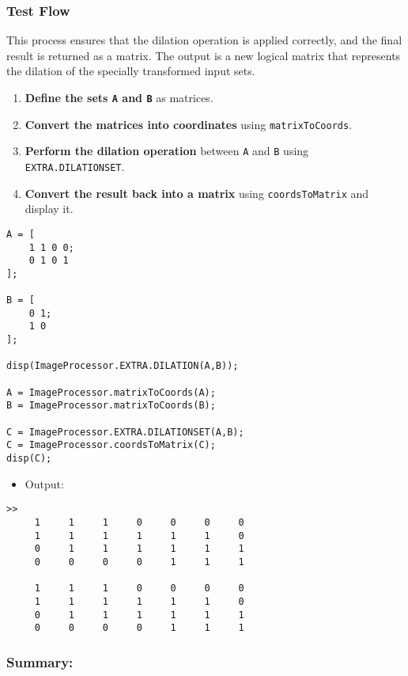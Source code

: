 \documentclass[11pt]{amsart}
\theoremstyle{remark}
\providecommand{\tightlist}{%
  \setlength{\itemsep}{0pt}\setlength{\parskip}{0pt}}
\theoremstyle{definition}
\theoremstyle{remark}
\numberwithin{equation}{section}
\begin{document}
\subsubsection{Test Flow}\label{test-flow}

This process ensures that the dilation operation is applied correctly,
and the final result is returned as a matrix. The output is a new
logical matrix that represents the dilation of the specially transformed
input sets.

\begin{enumerate}
\def\labelenumi{\arabic{enumi}.}
\tightlist
\item
  \textbf{Define the sets \texttt{A} and \texttt{B}} as matrices.
\item
  \textbf{Convert the matrices into coordinates} using
  \texttt{matrixToCoords}.
\item
  \textbf{Perform the dilation operation} between \texttt{A} and
  \texttt{B} using \texttt{EXTRA.DILATIONSET}.
\item
  \textbf{Convert the result back into a matrix} using
  \texttt{coordsToMatrix} and display it.
\end{enumerate}

\begin{verbatim}
A = [
    1 1 0 0;
    0 1 0 1
];

B = [
    0 1;
    1 0
];

disp(ImageProcessor.EXTRA.DILATION(A,B));

A = ImageProcessor.matrixToCoords(A);
B = ImageProcessor.matrixToCoords(B);

C = ImageProcessor.EXTRA.DILATIONSET(A,B);
C = ImageProcessor.coordsToMatrix(C);
disp(C);
\end{verbatim}

\begin{itemize}
\tightlist
\item
  Output:
\end{itemize}

\begin{verbatim}
>> 
     1     1     1     0     0     0     0
     1     1     1     1     1     1     0
     0     1     1     1     1     1     1
     0     0     0     0     1     1     1

     1     1     1     0     0     0     0
     1     1     1     1     1     1     0
     0     1     1     1     1     1     1
     0     0     0     0     1     1     1
\end{verbatim}

\subsubsection{Summary:}\label{summary}
\end{document}
